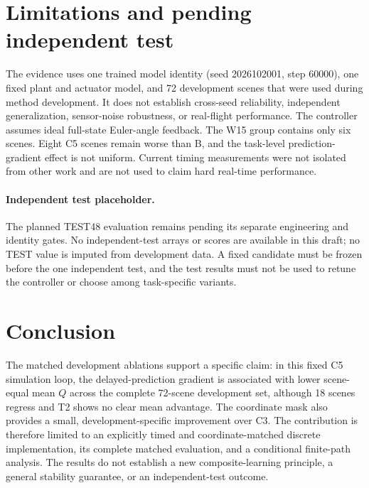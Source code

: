 \documentclass[11pt]{article}
\begin{document}
\section{Limitations and pending independent test}
The evidence uses one trained model identity (seed 2026102001, step 60000), one fixed plant and actuator model, and 72 development scenes that were used during method development. It does not establish cross-seed reliability, independent generalization, sensor-noise robustness, or real-flight performance. The controller assumes ideal full-state Euler-angle feedback. The W15 group contains only six scenes. Eight C5 scenes remain worse than B, and the task-level prediction-gradient effect is not uniform. Current timing measurements were not isolated from other work and are not used to claim hard real-time performance.

\paragraph{Independent test placeholder.}
The planned TEST48 evaluation remains pending its separate engineering and identity gates. No independent-test arrays or scores are available in this draft; no TEST value is imputed from development data. A fixed candidate must be frozen before the one independent test, and the test results must not be used to retune the controller or choose among task-specific variants.

\section{Conclusion}
The matched development ablations support a specific claim: in this fixed C5 simulation loop, the delayed-prediction gradient is associated with lower scene-equal mean $Q$ across the complete 72-scene development set, although 18 scenes regress and T2 shows no clear mean advantage. The coordinate mask also provides a small, development-specific improvement over C3. The contribution is therefore limited to an explicitly timed and coordinate-matched discrete implementation, its complete matched evaluation, and a conditional finite-path analysis. The results do not establish a new composite-learning principle, a general stability guarantee, or an independent-test outcome.



\end{document}
